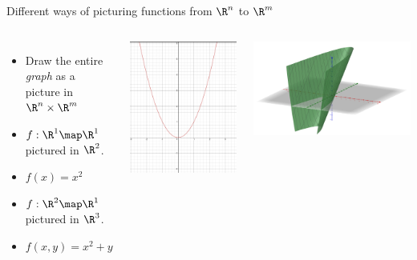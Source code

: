 \documentclass{beamer}
\begin{document}
\begin{frame}{Different ways of picturing functions from $\R^n$ to $\R^m$}


\begin{columns}
\column[T]{5cm}
\begin{itemize}
\item Draw the entire \emph{graph} as a picture in $\R^n \times \R^m$
\item $f:\R^1\map\R^1$ pictured in $\R^2$.
\item $f(x) = x^2$
\item $f:\R^2\map\R^1$ pictured in $\R^3$.
\item $f(x,y) = x^2 + y$
\end{itemize}

\column[T]{5cm}
\includegraphics[scale=0.1]{parabola}

\includegraphics[scale=0.1]{x-squared-plus-y}
\end{columns}

\end{frame}
\end{document}
